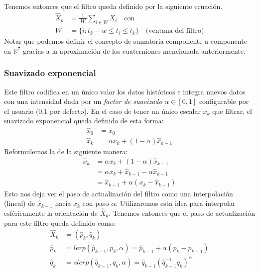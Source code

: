 \documentclass[ twoside,openright,titlepage,numbers=noenddot,%
                headinclude,footinclude,cleardoublepage=empty,abstract=on,
                BCOR=-5mm,paper=a4,fontsize=11pt
                ]{scrreprt}
\newcommand{\R}{\mathbb{R}}
\begin{document}
Tenemos entonces que el filtro queda definido por la siguiente ecuación.
\begin{align}
\hat{X}_k &= \frac{1}{|W|} \sum_{i \in W}{X_i}
\quad \text{con} \\
W &= \{ i : t_k - w \leq t_i \leq t_k \} \quad \text{(ventana del filtro)}
\end{align} Notar que podemos definir el concepto de sumatoria
componente a componente en \(\R^7\) gracias a la aproximación de los
cuaterniones mencionada anteriormente.

\hypertarget{suavizado-exponencial}{%
\subsubsection{Suavizado exponencial}\label{suavizado-exponencial}}

Este filtro codifica en un único valor los datos históricos e integra
nuevos datos con una intensidad dada por un \emph{factor de suavizado}
\(\alpha \in [0, 1]\) configurable por el usuario (0,1 por defecto). En
el caso de tener un único escalar \(x_k\) que filtrar, el suavizado
exponencial queda definido de esta forma: \begin{align}
\hat{x}_0 &= x_0 \\
\hat{x}_k &= \alpha x_k + (1 - \alpha) \hat{x}_{k-1} \label{eq:exp-smoothing-scalar}
\end{align} Reformulemos la  de la
siguiente manera: \begin{align}
\hat{x}_k &= \alpha x_k + (1 - \alpha) \hat{x}_{k-1} \\
&= \alpha x_k + \hat{x}_{k-1} - \alpha \hat{x}_{k-1} \\
&= \hat{x}_{k-1} + \alpha (x_k - \hat{x}_{k-1})
\end{align} Esto nos deja ver el paso de actualización del filtro como
una interpolación (lineal) de \(\hat{x}_{k-1}\) hacia \(x_k\) con paso
\(\alpha\). Utilizaremos esta idea para interpolar esféricamente la
orientación de \(\hat{X}_k\). Tenemos entonces que el paso de
actualización para este filtro queda definido como: \begin{align}
\hat{X}_k &= (\hat{p}_k, \hat{q}_k) \\
\hat{p}_k &= lerp(\hat{p}_{k-1}, p_k, \alpha) = \hat{p}_{k-1} + \alpha (p_k - \hat{p}_{k-1}) \\
\hat{q}_k &= slerp(\hat{q}_{k-1}, q_k, \alpha) = \hat{q}_{k-1}
(\hat{q}_{k-1}^{-1} q_k)^\alpha
\end{align}
\end{document}
